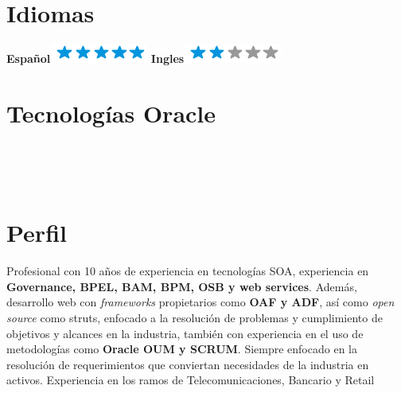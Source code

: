 \documentclass[]{friggeri-cv}
\begin{document}
\begin{aside}
 \section{Idiomas}
    \textbf{Español}\includegraphics[scale=0.40]{img/5stars.png}
    \textbf{Ingles}\includegraphics[scale=0.40]{img/2stars.png}
    ~
  \section{Tecnologías Oracle}
    ~
\end{aside}
~
\section{Perfil}
Profesional con 10 años de experiencia en tecnologías SOA, experiencia en \textbf{Governance, BPEL, BAM, BPM, OSB y web services}. Además, desarrollo web con \emph{frameworks} propietarios como \textbf{OAF y ADF}, así como \emph{open source} como struts, enfocado a la resolución de problemas y cumplimiento de objetivos y alcances en la industria, también con experiencia en el uso de metodologías como \textbf{Oracle OUM y SCRUM}. Siempre enfocado en la resolución de requerimientos que conviertan necesidades de la industria en activos. Experiencia en los ramos de Telecomunicaciones, Bancario y Retail\\
\end{document}
